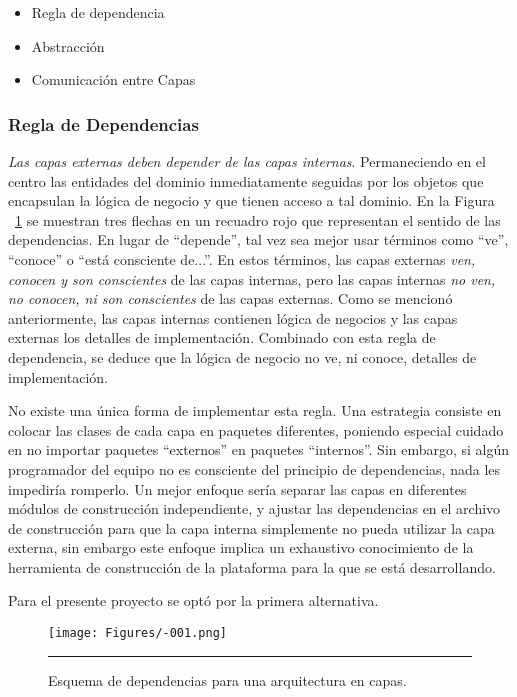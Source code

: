 \begin{itemize}
	\item Regla de dependencia
	\item Abstracción
	\item Comunicación entre Capas
\end{itemize}
\subsubsection{Regla de Dependencias}
\emph{Las capas externas deben depender de las capas internas}. Permaneciendo en el centro las entidades del dominio inmediatamente seguidas por los objetos que encapsulan la lógica de negocio y que tienen acceso a tal dominio.  En la Figura ~\ref{fig:Diagrama_clasico} se muestran tres flechas en un recuadro rojo que representan el sentido de las dependencias. En lugar de ``depende'', tal vez sea mejor usar términos como ``ve'', ``conoce'' o ``está consciente de...''. En estos términos, las capas externas \emph{ven, conocen y son conscientes} de las capas internas, pero las capas internas \emph{no ven, no conocen, ni son conscientes} de las capas externas. Como se mencionó anteriormente, las capas internas contienen lógica de negocios y las capas externas  los detalles de implementación. Combinado con esta regla de dependencia, se deduce que la lógica de negocio no ve, ni conoce, detalles de implementación.

No existe una única forma de implementar esta regla. Una estrategia consiste en colocar las clases de cada capa en paquetes diferentes, poniendo especial cuidado en no importar paquetes ``externos'' en paquetes ``internos''. Sin embargo, si algún programador del equipo no es consciente del principio de dependencias, nada les impediría romperlo. Un mejor enfoque sería separar las capas en diferentes módulos de construcción independiente, y ajustar las dependencias en el archivo de construcción para que la capa interna simplemente no pueda utilizar la capa externa, sin embargo este enfoque implica un exhaustivo conocimiento de la herramienta de construcción de la plataforma para la que se está desarrollando.

Para el presente proyecto se optó por la primera alternativa.

\begin{figure}[htbp]
	\centering
	\texttt{[image: Figures/-001.png]}
	\rule{35em}{1pt}
	\caption[Principio de Dependecias]{Esquema de dependencias para una arquitectura en capas.}
	\label{fig:Diagrama_clasico}
\end{figure}

